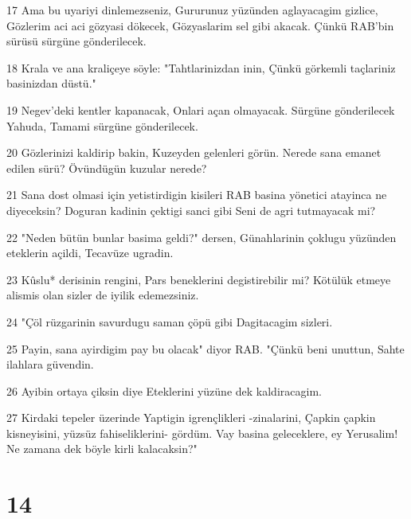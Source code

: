 \par 17 Ama bu uyariyi dinlemezseniz, Gururunuz yüzünden aglayacagim gizlice, Gözlerim aci aci gözyasi dökecek, Gözyaslarim sel gibi akacak. Çünkü RAB'bin sürüsü sürgüne gönderilecek.
\par 18 Krala ve ana kraliçeye söyle: "Tahtlarinizdan inin, Çünkü görkemli taçlariniz basinizdan düstü."
\par 19 Negev'deki kentler kapanacak, Onlari açan olmayacak. Sürgüne gönderilecek Yahuda, Tamami sürgüne gönderilecek.
\par 20 Gözlerinizi kaldirip bakin, Kuzeyden gelenleri görün. Nerede sana emanet edilen sürü? Övündügün kuzular nerede?
\par 21 Sana dost olmasi için yetistirdigin kisileri RAB basina yönetici atayinca ne diyeceksin? Doguran kadinin çektigi sanci gibi Seni de agri tutmayacak mi?
\par 22 "Neden bütün bunlar basima geldi?" dersen, Günahlarinin çoklugu yüzünden eteklerin açildi, Tecavüze ugradin.
\par 23 Kûslu* derisinin rengini, Pars beneklerini degistirebilir mi? Kötülük etmeye alismis olan sizler de iyilik edemezsiniz.
\par 24 "Çöl rüzgarinin savurdugu saman çöpü gibi Dagitacagim sizleri.
\par 25 Payin, sana ayirdigim pay bu olacak" diyor RAB. "Çünkü beni unuttun, Sahte ilahlara güvendin.
\par 26 Ayibin ortaya çiksin diye Eteklerini yüzüne dek kaldiracagim.
\par 27 Kirdaki tepeler üzerinde Yaptigin igrençlikleri -zinalarini, Çapkin çapkin kisneyisini, yüzsüz fahiseliklerini- gördüm. Vay basina geleceklere, ey Yerusalim! Ne zamana dek böyle kirli kalacaksin?"

\chapter{14}

